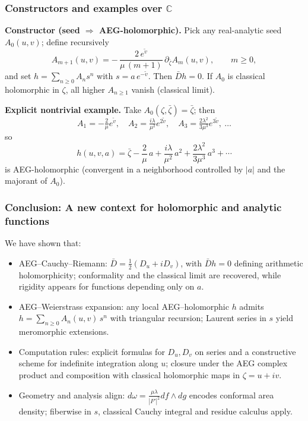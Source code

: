 \documentclass[aspectratio=169]{beamer}
\begin{document}
\begin{frame}
  \frametitle{Constructors and examples over $\mathbb C$}
  \textbf{Constructor (seed $\Rightarrow$ AEG-holomorphic).}
  Pick any real-analytic seed $A_0(u,v)$; define recursively
  \[
    A_{m+1}(u,v)=-\,\frac{2\,e^{\tilde v}}{\mu\,(m+1)}\,\partial_{\bar\zeta}A_m(u,v),
    \qquad m\ge0,
  \]
  and set $h=\sum_{n\ge0}A_n s^n$ with $s=a\,e^{-\tilde v}$. Then $\bar{D}h=0$.
  If $A_0$ is classical holomorphic in $\zeta$, all higher $A_{n\ge1}$ vanish (classical limit).

  \vspace{0.5em}
  \textbf{Explicit nontrivial example.}
  Take $A_0(\zeta,\bar\zeta)=\bar\zeta$; then
  \[
    A_1=-\tfrac{2}{\mu}e^{\tilde v},\quad
    A_2=\tfrac{i\lambda}{\mu^2}e^{2\tilde v},\quad
    A_3=\tfrac{2\lambda^2}{3\mu^3}e^{3\tilde v},\ \ldots
  \]
  so
  \[
    h(u,v,a)=\bar\zeta-\frac{2}{\mu}\,a+\frac{i\lambda}{\mu^2}\,a^2+\frac{2\lambda^2}{3\mu^3}\,a^3+\cdots
  \]
  is AEG-holomorphic (convergent in a neighborhood controlled by $|a|$ and the majorant of $A_0$).
\end{frame}

\begin{frame}
    \frametitle{Conclusion: A new context for holomorphic and analytic functions}
    We have shown that:
    \begin{itemize}
        \item AEG–Cauchy–Riemann: $\bar D=\tfrac12(D_u+iD_v)$, with $\bar D h=0$ defining arithmetic holomorphicity; conformality and the classical limit are recovered, while rigidity appears for functions depending only on $a$.
        \item AEG–Weierstrass expansion: any local AEG–holomorphic $h$ admits $h=\sum_{n\ge0}A_n(u,v)\,s^n$ with triangular recursion; Laurent series in $s$ yield meromorphic extensions.
        \item Computation rules: explicit formulas for $D_u, D_v$ on series and a constructive scheme for indefinite integration along $u$; closure under the AEG complex product and composition with classical holomorphic maps in $\zeta=u+iv$.
        \item Geometry and analysis align: $d\omega=\frac{\mu\lambda}{|F'|^2}df\wedge dg$ encodes conformal area density; fiberwise in $s$, classical Cauchy integral and residue calculus apply.
    \end{itemize}
\end{frame}

\end{document}
